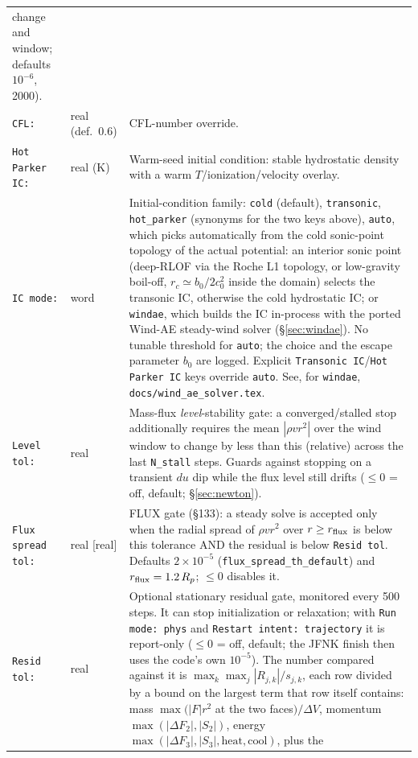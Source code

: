 \documentclass[english,a4paper]{my_memo}
\begin{document}
\begin{longtable}{@{}p{}p{}p{}@{}}
  change and window; defaults $10^{-6}$, 2000). \\
\texttt{CFL:} & real (def.\ 0.6) & CFL-number override. \\
\texttt{Hot Parker IC:} & real (K) & Warm-seed initial condition: stable
  hydrostatic density with a warm $T$/ionization/velocity overlay. \\
\texttt{IC mode:} & word & Initial-condition family:
  \texttt{cold} (default), \texttt{transonic}, \texttt{hot\_parker}
  (synonyms for the two keys above), \texttt{auto}, which picks
  automatically from the cold sonic-point topology of the actual
  potential: an interior sonic point (deep-RLOF via the Roche L1
  topology, or low-gravity boil-off, $r_c\simeq b_0/2c_0^2$ inside the
  domain) selects the transonic IC, otherwise the cold hydrostatic IC;
  or \texttt{windae}, which builds the IC in-process with the ported Wind-AE
  steady-wind solver (\S\ref{sec:windae}). No tunable threshold for
  \texttt{auto}; the choice and the escape parameter $b_0$ are
  logged. Explicit \texttt{Transonic IC}/\texttt{Hot Parker IC} keys
  override \texttt{auto}. See, for
  \texttt{windae}, \texttt{docs/wind\_ae\_solver.tex}. \\
\texttt{Level tol:} & real & Mass-flux \emph{level}-stability gate: a
  converged/stalled stop additionally requires the mean $|\rho v r^2|$ over the
  wind window to change by less than this (relative) across the last
  \texttt{N\_stall} steps. Guards against stopping on a transient $du$ dip while
  the flux level still drifts ($\le0$ = off, default; \S\ref{sec:newton}). \\
\texttt{Flux spread tol:} & real [real] & FLUX gate (\S133): a steady solve is
  accepted only when the radial spread of $\rho v r^2$ over $r\ge r_{\rm flux}$
  is below this tolerance AND the residual is below \texttt{Resid tol}.
  Defaults $2\times10^{-5}$ (\texttt{flux\_spread\_th\_default}) and
  $r_{\rm flux}=1.2\,R_p$; $\le0$ disables it. \\
\texttt{Resid tol:} & real & Optional stationary residual gate,
  monitored every 500 steps. It can stop initialization or relaxation;
  with \texttt{Run mode: phys} and \texttt{Restart intent: trajectory}
  it is report-only ($\le0$ = off, default; the JFNK finish then
  uses the code's own $10^{-5}$). The number compared against it is
  $\max_k \max_j |R_{j,k}|/s_{j,k}$, each row divided by a bound on the
  largest term that row itself contains: mass
  $\max(|F|r^2$ at the two faces$)/\Delta V$, momentum
  $\max(|\Delta F_2|,|S_2|)$, energy
  $\max(|\Delta F_3|,|S_3|,\mathrm{heat},\mathrm{cool})$, plus the

\end{longtable}
\end{document}

